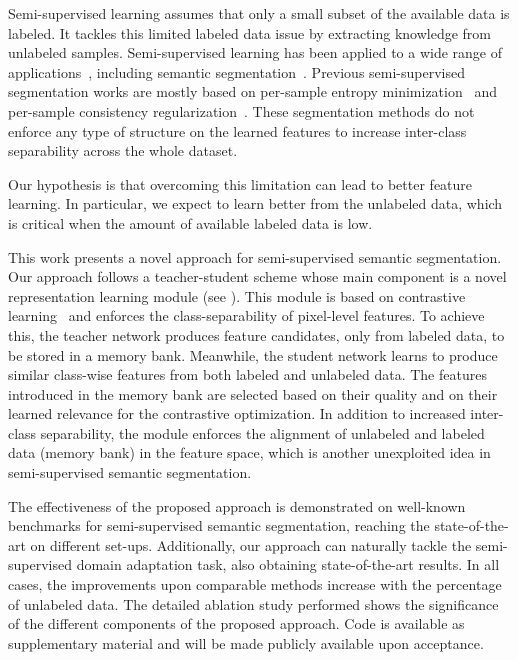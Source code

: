 \documentclass[10pt,twocolumn,letterpaper]{article}
\begin{document}
Semi-supervised learning assumes that only a small subset of the available data is labeled. It tackles this limited labeled data issue by extracting knowledge from unlabeled samples. 
Semi-supervised learning has been applied to a wide range of applications~\cite{van2020survey}, including semantic segmentation~\cite{french2019semi, hung2018adversarial, mittal2019semi}.
Previous semi-supervised segmentation works are mostly based on per-sample entropy minimization~\cite{hung2018adversarial, lee2013pseudo, olsson2021classmix} and per-sample consistency regularization~\cite{french2019semi, tarvainen2017mean, olsson2021classmix}. These segmentation methods do not enforce any type of structure on the learned features to increase inter-class separability across the whole dataset.


Our hypothesis is that overcoming this limitation can lead to better feature learning. In particular, we expect to learn better from the unlabeled data, which is critical when the amount of available labeled data is low.


 
This work presents a novel approach for semi-supervised semantic segmentation.
Our approach follows a teacher-student scheme whose main component is a novel representation learning module (see ). This module is based on contrastive learning~\cite{hadsell2006dimensionality} and enforces the class-separability of pixel-level features. To achieve this, the teacher network produces feature candidates, only from labeled data, to be stored in a memory bank. Meanwhile, the student network learns to produce similar class-wise features from both labeled and unlabeled data.
The features introduced in the memory bank are selected based on their quality and on their learned relevance for the contrastive optimization. In addition to increased inter-class separability, the module enforces the alignment of unlabeled and labeled data (memory bank) in the feature space, which is another unexploited idea in semi-supervised semantic segmentation. 


The effectiveness of the proposed approach is demonstrated on well-known benchmarks for semi-supervised semantic segmentation, reaching the state-of-the-art on different set-ups.
Additionally, our approach can naturally tackle the semi-supervised domain adaptation task, also obtaining state-of-the-art results. 
In all cases, the improvements upon comparable methods increase with the percentage of unlabeled data. 
The detailed ablation study performed shows the significance of the different components of the proposed approach. Code is available as supplementary material and will be made publicly available upon acceptance.
\end{document}
